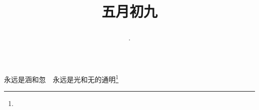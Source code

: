 \title{\date[d=14,m=6,y=2024][year:cn-y,年,month:cn,day:cn,日,·,weekday]·五月初九 }
永远是涵和忽　永远是光和无的通明\footnote{ }

